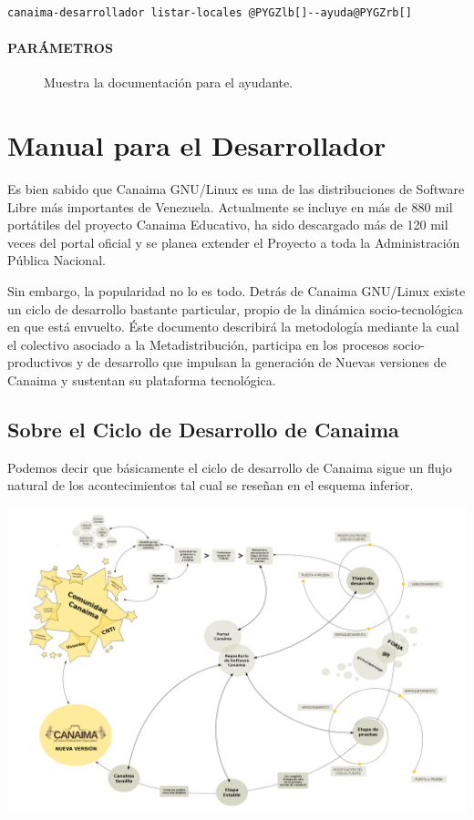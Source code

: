 \documentclass[letterpaper,12pt,spanish]{manual}
\begin{document}
\begin{Verbatim}[commandchars=@\[\]]
canaima-desarrollador listar-locales @PYGZlb[]--ayuda@PYGZrb[]
\end{Verbatim}


\subsubsection{PARÁMETROS}
\begin{description}
\item[{}] \leavevmode
Muestra la documentación para el ayudante.

\end{description}

\resetcurrentobjects
\hypertarget{--doc-manual-desarrollador}{}

\chapter{\textbf{Manual para el Desarrollador}}

Es bien sabido que Canaima GNU/Linux es una de las distribuciones de Software Libre más importantes de Venezuela. Actualmente se incluye en más de 880 mil portátiles del proyecto Canaima Educativo, ha sido descargado más de 120 mil veces del portal oficial y se planea extender el Proyecto a toda la Administración Pública Nacional.

Sin embargo, la popularidad no lo es todo. Detrás de Canaima GNU/Linux existe un ciclo de desarrollo bastante particular, propio de la dinámica socio-tecnológica en que está envuelto. Éste documento describirá la metodología mediante la cual el colectivo asociado a la Metadistribución, participa en los procesos socio-productivos y de desarrollo que impulsan la generación de Nuevas versiones de Canaima y sustentan su plataforma tecnológica.


\section{\textbf{Sobre el Ciclo de Desarrollo de Canaima}}

Podemos decir que básicamente el ciclo de desarrollo de Canaima sigue un flujo natural de los acontecimientos tal cual se reseñan en el esquema inferior.

\includegraphics{diagrama.png}
\end{document}

